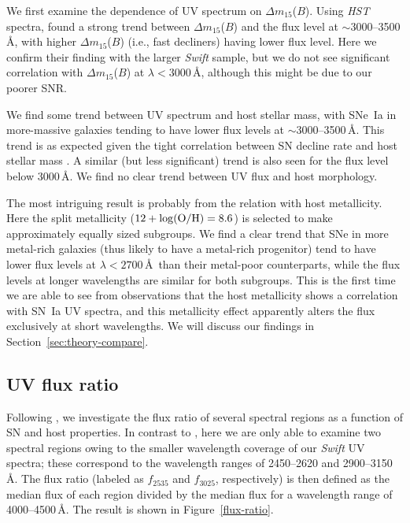 \documentclass[useAMS,usenatbib]{mn2e}
\newcommand{\deltam}{\ensuremath{\Delta m_{15}}}
\begin{document}
We first examine the dependence of UV spectrum on $\deltam$($B$). Using {\it HST} spectra, \citet{2016MNRAS.461.1308F} found a strong trend between $\deltam$($B$) and the flux level at $\sim3000$--3500\,\AA, with higher $\deltam$($B$) (i.e., fast decliners) having lower flux level. Here we confirm their finding with the larger {\it Swift} sample, but we do not see significant correlation with $\deltam$($B$) at $\lambda<3000$\,\AA, although this might be due to our poorer SNR.

We find some trend between UV spectrum and host stellar mass, with SNe~Ia in more-massive galaxies tending to have lower flux levels at $\sim3000$--3500\,\AA. This trend is as expected given the tight correlation between SN decline rate and host stellar mass \citep[e.g.,][]{2014MNRAS.438.1391P}. A similar (but less significant) trend is also seen for the flux level below $3000$\,\AA. We find no clear trend between UV flux and host morphology.

The most intriguing result is probably from the relation with host metallicity. Here the split metallicity ($\rm12+\log(O/H)=8.6$) is selected to make approximately equally sized subgroups. We find a clear trend that SNe in more metal-rich galaxies (thus likely to have a metal-rich progenitor) tend to have lower flux levels at $\lambda<2700$\,\AA\ than their metal-poor counterparts, while the flux levels at longer wavelengths are similar for both subgroups. This is the first time we are able to see from observations that the host metallicity shows a correlation with SN~Ia UV spectra, and this metallicity effect apparently alters the flux exclusively at short wavelengths. We will discuss our findings in Section~\ref{sec:theory-compare}.

\subsection{UV flux ratio}
\label{sec:flux-ratio}
Following \citet{2016MNRAS.461.1308F}, we investigate the flux ratio of several spectral regions as a function of SN and host properties. In contrast to \citet{2016MNRAS.461.1308F}, here we are only able to examine two spectral regions owing to the smaller wavelength coverage of our {\it Swift} UV spectra; these correspond to the wavelength ranges of 2450--2620 and 2900--3150\,\AA. The flux ratio (labeled as $f_{2535}$ and $f_{3025}$, respectively) is then defined as the median flux of each region divided by the median flux for a wavelength range of 4000--4500\,\AA. The result is shown in Figure~\ref{flux-ratio}.
\end{document}
